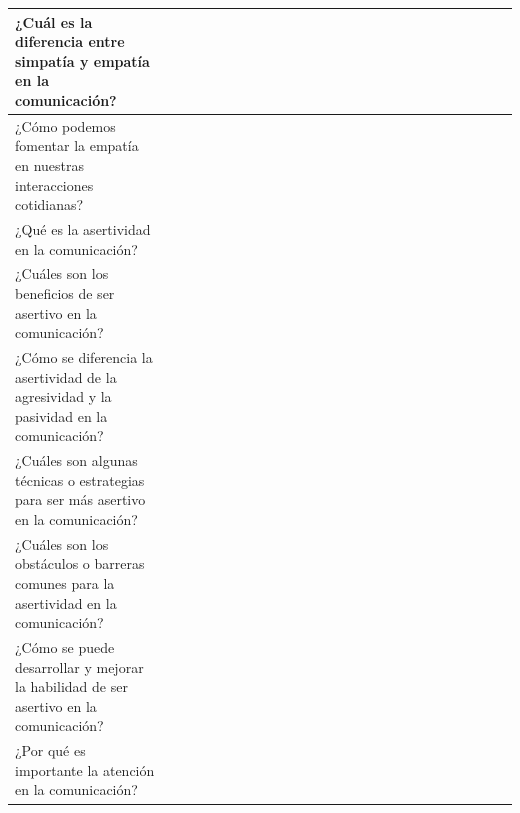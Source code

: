 \documentclass[12pt,a4paper]{article}
\begin{document}
\begin{landscape}
\begin{table}[ht!]
\begin{tabular}{llllllllllllllllllllllllll}
			¿Cuál es la diferencia entre simpatía y empatía en la comunicación?                                    &                                          &    &    &    &    &    &    &    &    &     &     &     &     &     &     &     &     &     &     &     &           \\\hline
			¿Cómo podemos fomentar la empatía en nuestras interacciones cotidianas?                                &                                          &    &    &    &    &    &    &    &    &     &     &     &     &     &     &     &     &     &     &     &           \\\hline
			¿Qué es la asertividad en la comunicación?                                                             &                                          &    &    &    &    &    &    &    &    &     &     &     &     &     &     &     &     &     &     &     &           \\\hline
			¿Cuáles son los beneficios de ser asertivo en la comunicación?                                         &                                          &    &    &    &    &    &    &    &    &     &     &     &     &     &     &     &     &     &     &     &           \\\hline
			¿Cómo se diferencia la asertividad de la agresividad y la pasividad en la comunicación?                &                                          &    &    &    &    &    &    &    &    &     &     &     &     &     &     &     &     &     &     &     &           \\\hline
			¿Cuáles son algunas técnicas o estrategias para ser más asertivo en la comunicación?                   &                                          &    &    &    &    &    &    &    &    &     &     &     &     &     &     &     &     &     &     &     &           \\\hline
			¿Cuáles son los obstáculos o barreras comunes para la asertividad en la comunicación?                  &                                          &    &    &    &    &    &    &    &    &     &     &     &     &     &     &     &     &     &     &     &           \\\hline
			¿Cómo se puede desarrollar y mejorar la habilidad de ser asertivo en la comunicación?                  &                                          &    &    &    &    &    &    &    &    &     &     &     &     &     &     &     &     &     &     &     &           \\\hline
			¿Por qué es importante la atención en la comunicación?                                                 &                                          &    &    &    &    &    &    &    &    &     &     &     &     &     &     &     &     &     &     &     &           \\\hline

\end{tabular}
\end{table}
\end{landscape}
\end{document}
